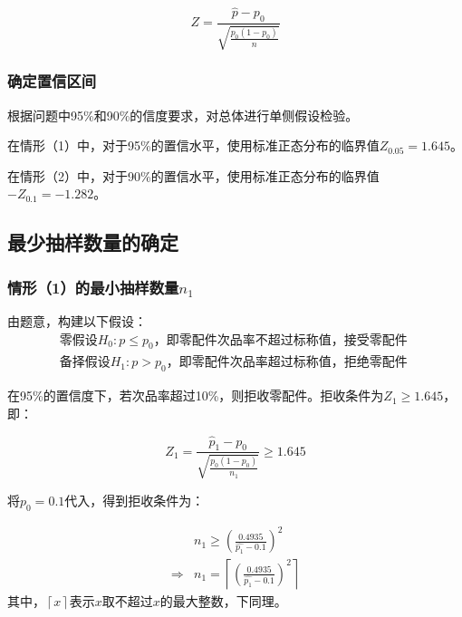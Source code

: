 \documentclass[withoutpreface,bwprint]{cumcmthesis} %
\begin{document}
\begin{equation}
	Z=\frac{\hat{p}-p_0}{\sqrt{\frac{p_0\left(1-p_0\right)}{n}}}
\end{equation}

\subsubsection{确定置信区间}

根据问题中95\%和90\%的信度要求，对总体进行单侧假设检验。

在情形（1）中，对于95\%的置信水平，使用标准正态分布的临界值$Z_{0.05}=1.645$。

在情形（2）中，对于90\%的置信水平，使用标准正态分布的临界值$-Z_{0.1}=-1.282$。

\subsection{最少抽样数量的确定}

\subsubsection{情形（1）的最小抽样数量$n_1$}

由题意，构建以下假设：
\begin{align*}
			\text{零假设}H_0:p\leqslant p_0\text{，即零配件次品率不超过标称值，接受零配件 }\\
			\text{备择假设}H_1:p> p_0\text{，即零配件次品率超过标称值，拒绝零配件}
\end{align*}



在95\%的置信度下，若次品率超过10\%，则拒收零配件。拒收条件为$Z_1\geqslant 1.645$，即：

\begin{equation}
	Z_1 = \frac{\hat{p}_1-p_0}{\sqrt{\frac{p_0\left(1-p_0\right)}{n_1}}} \geqslant 1.645
\end{equation}

将$p_0=0.1$代入，得到拒收条件为：

%
\begin{equation}
	\begin{aligned}
		& n_1 \geqslant\left(\frac{0.4935}{\hat{p_1}-0.1}\right)^2 \\
		\Rightarrow & n_1=\left\lceil\left(\frac{0.4935}{\hat{p_1}-0.1}\right)^2\right\rceil
	\end{aligned}
		\label{拒收}
\end{equation}
其中，$\left\lceil x \right\rceil$表示$x$取不超过$x$的最大整数，下同理。
\end{document}
